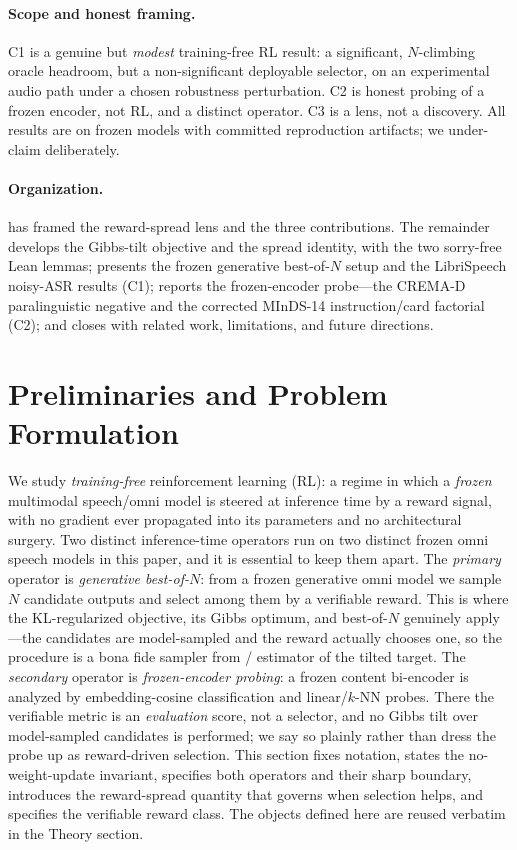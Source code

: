\paragraph{Scope and honest framing.}
C1 is a genuine but \emph{modest} training-free RL result: a significant, $N$-climbing oracle headroom, but a non-significant deployable selector, on an experimental audio path under a chosen robustness perturbation. C2 is honest probing of a frozen encoder, not RL, and a distinct operator. C3 is a lens, not a discovery. All results are on frozen models with committed reproduction artifacts; we under-claim deliberately.

\paragraph{Organization.}
 has framed the reward-spread lens and the three contributions. The remainder develops the Gibbs-tilt objective and the spread identity, with the two sorry-free Lean lemmas; presents the frozen generative best-of-$N$ setup and the LibriSpeech noisy-ASR results (C1); reports the frozen-encoder probe---the CREMA-D paralinguistic negative and the corrected MInDS-14 instruction/card factorial (C2); and closes with related work, limitations, and future directions.

\section{Preliminaries and Problem Formulation}
\label{sec:prelim}

We study \emph{training-free} reinforcement learning (RL): a regime in which a \emph{frozen} multimodal speech/omni model is steered at inference time by a reward signal, with no gradient ever propagated into its parameters and no architectural surgery. Two distinct inference-time operators run on two distinct frozen omni speech models in this paper, and it is essential to keep them apart. The \emph{primary} operator is \emph{generative best-of-$N$}: from a frozen generative omni model we sample $N$ candidate outputs and select among them by a verifiable reward. This is where the KL-regularized objective, its Gibbs optimum, and best-of-$N$ genuinely apply---the candidates are model-sampled and the reward actually chooses one, so the procedure is a bona fide sampler from / estimator of the tilted target. The \emph{secondary} operator is \emph{frozen-encoder probing}: a frozen content bi-encoder is analyzed by embedding-cosine classification and linear/$k$-NN probes. There the verifiable metric is an \emph{evaluation} score, not a selector, and no Gibbs tilt over model-sampled candidates is performed; we say so plainly rather than dress the probe up as reward-driven selection. This section fixes notation, states the no-weight-update invariant, specifies both operators and their sharp boundary, introduces the reward-spread quantity that governs when selection helps, and specifies the verifiable reward class. The objects defined here are reused verbatim in the Theory section.


